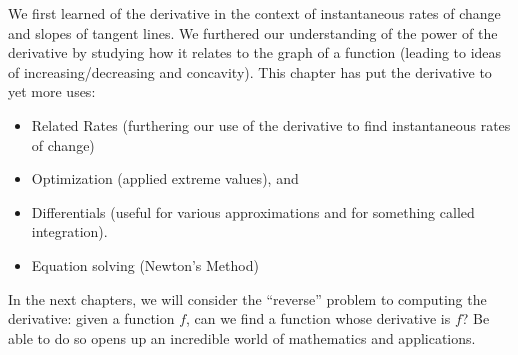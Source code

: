 We first learned of the derivative in the context of instantaneous rates of change and slopes of tangent lines. We furthered our understanding of the power of the derivative by studying how it relates to the graph of a function (leading to ideas of increasing/decreasing and concavity). This chapter has put the derivative to yet more uses:
\begin{itemize}
\item	Related Rates (furthering our use of the derivative to find instantaneous rates of change)
\item	Optimization (applied extreme values), and
\item	Differentials (useful for various approximations and for something called integration).
\item Equation solving (Newton's Method)
\end{itemize}

In the next chapters, we will consider the ``reverse'' problem to computing the derivative: given a function $f$, can we find a function whose derivative is $f$\primeskip? Be able to do so opens up an incredible world of mathematics and applications.


